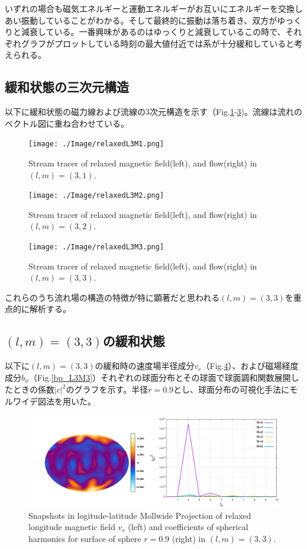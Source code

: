 \documentclass[12pt]{jsarticle}
\begin{document}
いずれの場合も磁気エネルギーと運動エネルギーがお互いにエネルギーを交換しあい振動していることがわかる。そして最終的に振動は落ち着き、双方がゆっくりと減衰している。一番興味があるのはゆっくりと減衰しているこの時で、それぞれグラフがプロットしている時刻の最大値付近では系が十分緩和していると考えられる。


\subsection{緩和状態の三次元構造}
以下に緩和状態の磁力線および流線の3次元構造を示す（Fig.\ref{L3M1_relaxed}-\ref{L3M3_relaxed})。流線は流れのベクトル図に重ね合わせている。

\begin{figure}[H]
\centering
\texttt{[image: ./Image/relaxedL3M1.png]}
\caption{Stream tracer of relaxed magnetic field(left), and flow(right) in $(l,m)=(3,1)$.} \label{L3M1_relaxed}
\end{figure}
\begin{figure}[H]
\centering
\texttt{[image: ./Image/relaxedL3M2.png]}
\caption{Stream tracer of relaxed magnetic field(left), and flow(right) in $(l,m)=(3,2)$.} \label{L3M2_relaxed}
\end{figure}
\begin{figure}[H]
\centering
\texttt{[image: ./Image/relaxedL3M3.png]}
\caption{Stream tracer of relaxed magnetic field(left), and flow(right) in $(l,m)=(3,3)$.}\label{L3M3_relaxed}
\end{figure}

これらのうち流れ場の構造の特徴が特に顕著だと思われる$(l,m)=(3,3)$を重点的に解析する。

\subsection{$(l,m)=(3,3)$の緩和状態}
以下に$(l,m)=(3,3)$の緩和時の速度場半径成分$v_r$（Fig.\ref{vr_L3M3}）、および磁場経度成分$b_\phi$（Fig.\ref{bp_L3M3}）それぞれの球面分布とその球面で球面調和関数展開したときの係数${|c|}^2$のグラフを示す。半径$r=0.9$とし、球面分布の可視化手法にモルワイデ図法を用いた。

\begin{figure}[H]
\centering
\includegraphics[height=0.5\textheight,width=1.0\hsize,angle=0,keepaspectratio]{./Image/vr_L3M3.png}
\caption{Snapshots in logitude-latitude Mollwide Projection of relaxed longitude magnetic field $v_r$ (left) and coefficients of spherical harmonics for surface of sphere $r=0.9$ (right) in $(l,m)=(3,3)$.}\label{vr_L3M3}
\end{figure}
\end{document}
